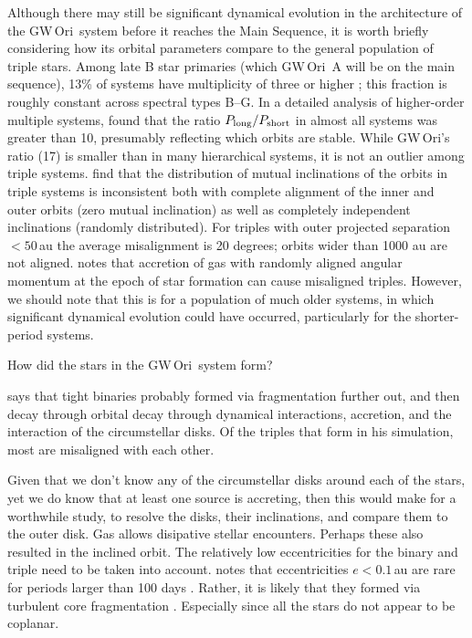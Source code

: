 \documentclass[twocolumn]{aastex61}
\newcommand{\obj}{GW\,Ori}
\begin{document}
Although there may still be significant dynamical evolution in the architecture of the \obj\ system before it reaches the Main Sequence, it is worth briefly considering how its orbital parameters compare to the general population of triple stars. Among late B star primaries (which \obj~A will be on the main sequence), 13\% of systems have multiplicity of three or higher \citep{eggleton08}; this fraction is roughly constant across spectral types B--G. In a detailed analysis of higher-order multiple systems, \citet{tokovinin97} found that the ratio $P_\mathrm{long} / P_{\rm short}$ in almost all systems was greater than 10, presumably reflecting which orbits are stable. While \obj's ratio (17) is smaller than in many hierarchical systems, it is not an outlier among triple systems.
\citet{tokovinin97,tokovinin17} find that the distribution of mutual inclinations of the orbits in triple systems is inconsistent both with complete alignment of the inner and outer orbits (zero mutual inclination) as well as completely independent inclinations (randomly distributed).
For triples with outer projected separation $< 50\,$au the average misalignment is 20 degrees; orbits wider than 1000 au are not aligned. \citet{tokovinin17} notes that accretion of gas with randomly aligned angular momentum at the epoch of star formation can cause misaligned triples. However, we should note that this is for a population of much older systems, in which significant dynamical evolution could have occurred, particularly for the shorter-period systems.

How did the stars in the \obj\ system form?

\cite{bate12} says that tight binaries probably formed via fragmentation further out, and then decay through orbital decay through dynamical interactions, accretion, and the interaction of the circumstellar disks. Of the triples that form in his simulation, most are misaligned with each other.

Given that we don't know any of the circumstellar disks around each of the stars, yet we do know that at least one source is accreting, then this would make for a worthwhile study, to resolve the disks, their inclinations, and compare them to the outer disk. Gas allows disipative stellar encounters. Perhaps these also resulted in the inclined orbit. The relatively low eccentricities for the binary and triple need to be taken into account. \citet{bate12} notes that eccentricities $e < 0.1\,$au are rare for periods larger than 100 days \citep{raghavan10}.
Rather, it is likely that they formed via turbulent core fragmentation \citep{offner10}. Especially since all the stars do not appear to be coplanar.
\end{document}
